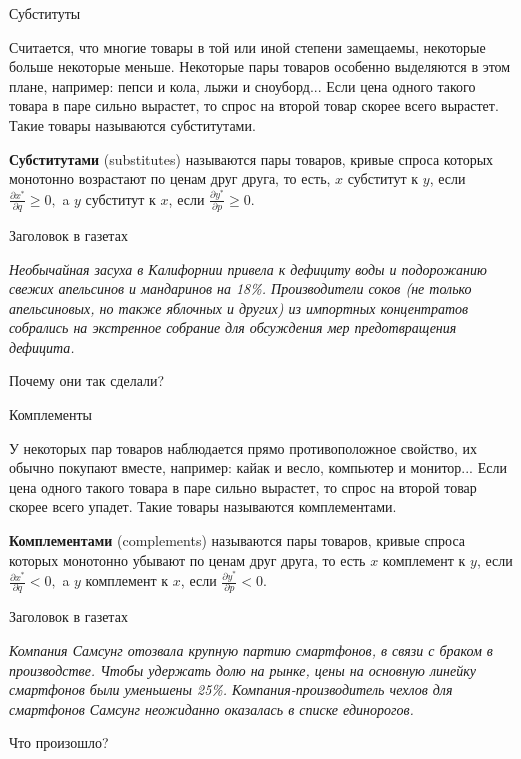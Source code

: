 \documentclass{beamer}
\begin{document}
\begin{frame}{Субституты}

Считается, что многие товары в той или иной степени замещаемы, некоторые больше некоторые меньше. Некоторые пары товаров особенно выделяются в этом плане, например: пепси и кола, лыжи и сноуборд... Если цена одного такого товара в паре сильно вырастет, то спрос на второй товар скорее всего вырастет. Такие товары называются субститутами.

\begin{definition}
\textbf{Субститутами} (substitutes) называются пары товаров, кривые спроса которых монотонно возрастают по ценам друг друга, то есть, $x$ субститут к $y$, если $\frac{\partial x^{\ast}}{\partial q} \geqslant 0,$ a $y$ субститут к $x$, если $\frac{\partial y^{\ast}}{\partial p} \geqslant 0.$
\end{definition}

\end{frame}

\begin{frame}{Заголовок в газетах}

\textit{Необычайная засуха в Калифорнии привела к дефициту воды и подорожанию свежих апельсинов и мандаринов на 18\%. Производители соков (не только апельсиновых, но также яблочных и других) из импортных концентратов собрались на экстренное собрание для обсуждения мер предотвращения дефицита.}

Почему они так сделали?

\end{frame}

\begin{frame}{Комплементы}

У некоторых пар товаров наблюдается прямо противоположное свойство, их обычно покупают вместе, например: кайак и весло, компьютер и монитор...  Если цена одного такого товара в паре сильно вырастет, то спрос на второй товар скорее всего упадет. Такие товары называются комплементами.

\begin{definition}
\textbf{Комплементами} (complements) называются пары товаров, кривые спроса которых монотонно убывают по ценам друг друга, то есть $x$ комплемент к $y$, если $\frac{\partial x^{\ast}}{\partial q} < 0,$ a $y$ комплемент к $x$, если $\frac{\partial y^{\ast}}{\partial p} < 0.$
\end{definition}

\end{frame}

\begin{frame}{Заголовок в газетах}

\textit{Компания Самсунг отозвала крупную партию смартфонов, в связи с браком в производстве. Чтобы удержать долю на рынке, цены на основную линейку смартфонов были уменьшены 25\%. Компания-производитель чехлов для смартфонов Самсунг неожиданно оказалась в списке единорогов.}

Что произошло?

\end{frame}
\end{document}
